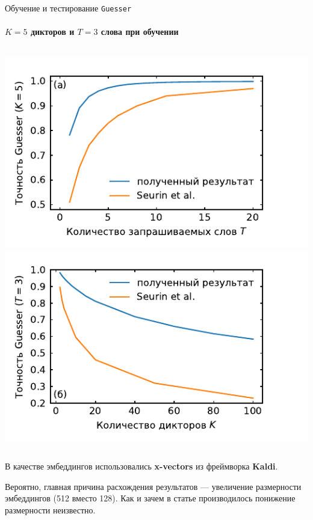 \documentclass[aspectratio=43]{beamer}
\newcommand{\guesser}{\texttt{Guesser}}
\newcommand{\imgscale}{0.67}
\begin{document}
\begin{frame}[t]{Обучение и тестирование \guesser{}}
    \framesubtitle{$K = 5$ дикторов  и $T = 3$ слова при обучении}
    \begin{columns}[T]
        \centering
        \mbox{\includegraphics[scale=\imgscale]{../plots/old/word_sweep.pdf}}
        \mbox{\includegraphics[scale=\imgscale]{../plots/old/guest_sweep.pdf}}
    \end{columns}\vspace*{1em}
    В качестве эмбеддингов использовались \textbf{x-vectors} из фреймворка
    \textbf{Kaldi}.\vspace{1em}

    Вероятно, главная причина расхождения результатов --- увеличение размерности
    эмбеддингов (512 вместо 128). Как и зачем в статье производилось понижение
    размерности неизвестно.
\end{frame}
\end{document}
